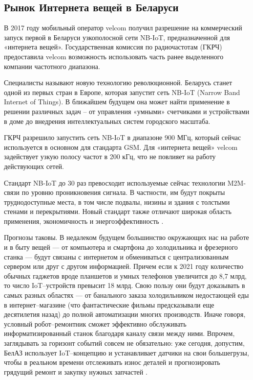 \subsection{Рынок Интернета вещей в Беларуси}
\label{sec:analysis:belarus}

В 2017 году мобильный оператор velcom получил разрешение на коммерческий запуск первой в Беларуси узкополосной сети NB-IoT, предназначенной для «интернета вещей». Государственная комиссия по радиочастотам (ГКРЧ) предоставила velcom возможность использовать часть ранее выделенного компании частотного диапазона.

Специалисты называют новую технологию революционной. Беларусь станет одной из первых стран в Европе, которая запустит сеть NB-IoT (Narrow Band Internet of Things). В ближайшем будущем она может найти применение в решении различных задач – от управления «умными» счетчиками и устройствами в доме до внедрения интеллектуальных систем городского масштаба.

ГКРЧ разрешило запустить сеть NB-IoT в диапазоне 900 МГц, который сейчас используется в основном для стандарта GSM. Для «интернета вещей» velcom задействует узкую полосу частот в 200 кГц, что не повлияет на работу действующих сетей.

Стандарт NB-IoT до 30 раз превосходит используемые сейчас технологии M2M-связи по уровню проникновения сигнала. В частности, им будут покрыты труднодоступные места, в том числе подвалы, низины и здания с толстыми стенами и перекрытиями. Новый стандарт также отличают широкая область применения, экономичность и энергоэффективность \cite{iot_belarus_velcom}.

Прогнозы таковы. В недалеком будущем большинство окружающих нас на работе и в быту вещей — от компьютера и смартфона до холодильника и фрезерного станка — будут связаны с интернетом и обмениваться с централизованным сервером или друг с другом информацией. Причем если к 2021 году количество обычных гаджетов вроде планшетов и умных телефонов увеличится до 8,7 млрд, то число IoT–устройств превысит 18 млрд. Свою пользу они будут доказывать в самых разных областях — от банального заказа холодильником недостающей еды в интернет–магазине (что фантастические фильмы предсказывали еще десятилетия назад) до полной автоматизации многих производств. Иначе говоря, условный робот–ремонтник сможет эффективно обслуживать информатизированный станок благодаря каналу связи между ними. Впрочем, заглядывать за горизонт событий совсем не обязательно: уже сегодня, допустим, БелАЗ использует IoT–концепцию и устанавливает датчики на свои большегрузы, чтобы в реальном времени отслеживать износ деталей и прогнозировать грядущий ремонт и закупку нужных запчастей \cite{iot_belarus_prog}.